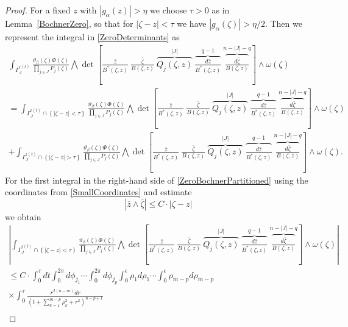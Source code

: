 \documentclass[11pt,reqno]{amsart}
\numberwithin{equation}{section}
\begin{document}
\begin{proof}  For a fixed $z$ with $|g_{\alpha}(z)|>\eta$ we choose $\tau>0$ as in
Lemma~\ref{BochnerZero}, so that for
$|\zeta-z|<\tau$ we have $|g_{\alpha}(\zeta)|>\eta/2$.  Then we represent the integral
in \eqref{ZeroDeterminants} as
\begin{multline}\label{ZeroBochnerPartitioned}
\int_{\Gamma^{\epsilon(t)}_J}
\frac{\vartheta_{\beta}(\zeta)\Phi(\zeta)}{\prod_{j\in J}P_j(\zeta)}
\bigwedge\det\left[\frac{\bar z}{B^*(\zeta,z)}\ \frac{\bar\zeta}{B(\zeta,z)}\
\overbrace{Q_j(\zeta,z)}^{|J|}\
\overbrace{\frac{d{\bar z}}{B^*(\zeta,z)}}^{q-1}\
\overbrace{\frac{d{\bar\zeta}}{B(\zeta,z)}}^{n-|J|-q}\right]\wedge\omega(\zeta)\\
=\int_{\Gamma^{\epsilon(t)}_J\cap\left\{|\zeta-z|<\tau\right\}}
\frac{\vartheta_{\beta}(\zeta)\Phi(\zeta)}{\prod_{j\in J}P_j(\zeta)}
\bigwedge\det\left[\frac{\bar z}{B^*(\zeta,z)}\ \frac{\bar\zeta}{B(\zeta,z)}\
\overbrace{Q_j(\zeta,z)}^{|J|}\
\overbrace{\frac{d{\bar z}}{B^*(\zeta,z)}}^{q-1}\
\overbrace{\frac{d{\bar\zeta}}{B(\zeta,z)}}^{n-|J|-q}\right]\wedge\omega(\zeta)\\
+\int_{\Gamma^{\epsilon(t)}_J\cap\left\{|\zeta-z|>\tau\right\}}
\frac{\vartheta_{\beta}(\zeta)\Phi(\zeta)}{\prod_{j\in J}P_j(\zeta)}
\bigwedge\det\left[\frac{\bar z}{B^*(\zeta,z)}\ \frac{\bar\zeta}{B(\zeta,z)}\
\overbrace{Q_j(\zeta,z)}^{|J|}\
\overbrace{\frac{d{\bar z}}{B^*(\zeta,z)}}^{q-1}\
\overbrace{\frac{d{\bar\zeta}}{B(\zeta,z)}}^{n-|J|-q}\right]\wedge\omega(\zeta).
\end{multline}
For the first integral in the right-hand side of \eqref{ZeroBochnerPartitioned} 
using the coordinates from \eqref{SmallCoordinates} and estimate
$$\left|{\bar z}\wedge \bar{\zeta}\right|\leq C\cdot |\zeta-z|$$
we obtain
\begin{multline}\label{FirstZeroBochner}
\left|\int_{\Gamma^{\epsilon(t)}_J\cap\left\{|\zeta-z|<\tau\right\}}
\frac{\vartheta_{\beta}(\zeta)\Phi(\zeta)}{\prod_{j\in J}P_j(\zeta)}
\bigwedge\det\left[\frac{\bar z}{B^*(\zeta,z)}\ \frac{\bar\zeta}{B(\zeta,z)}\
\overbrace{Q_j(\zeta,z)}^{|J|}\
\overbrace{\frac{d{\bar z}}{B^*(\zeta,z)}}^{q-1}\
\overbrace{\frac{d{\bar\zeta}}{B(\zeta,z)}}^{n-|J|-q}\right]\wedge\omega(\zeta)\right|\\
\leq C\cdot\int_0^{\tau}dt\int_0^{2\pi} d\phi_{j_1}\cdots\int_0^{2\pi} d\phi_{j_p}
\int_0^{\epsilon}\rho_1 d\rho_1\cdots\int_0^{\epsilon}\rho_{m-p}d\rho_{m-p}\\
\times\int_0^{\tau}\frac{r^{2(n-m)}dr}
{\left(t+\sum_{k=1}^{m-p}\rho_k^2+r^2\right)^{n-p+1}}\\

\end{multline}
\end{proof}
\end{document}
